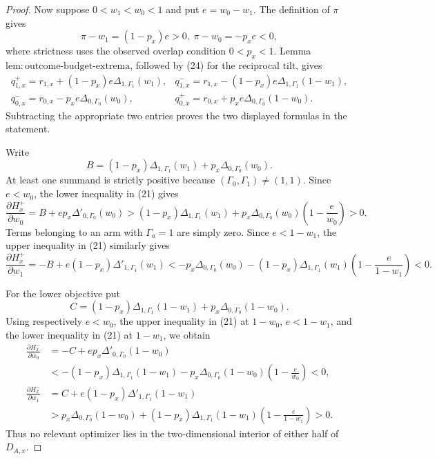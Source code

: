 \documentclass{article}
\begin{document}
\begin{proof}
Now suppose \(0<w_1<w_0<1\) and put \(e=w_0-w_1\).  The definition of \(\pi\) gives
\[
 \pi-w_1=(1-p_x)e>0,
 \; \pi-w_0=-p_xe<0,
 \tag{26}
\]
where strictness uses the observed overlap condition \(0<p_x<1\).  Lemma \(\mathrm{lem{:}outcome\text{-}budget\text{-}extrema}\), followed by (24) for the reciprocal tilt, gives
\[
\begin{array}{ll}
q^+_{1,x}=r_{1,x}+(1-p_x)e\Delta_{1,\Gamma_1}(w_1),
&q^-_{1,x}=r_{1,x}-(1-p_x)e\Delta_{1,\Gamma_1}(1-w_1),\\
q^-_{0,x}=r_{0,x}-p_xe\Delta_{0,\Gamma_0}(w_0),
&q^+_{0,x}=r_{0,x}+p_xe\Delta_{0,\Gamma_0}(1-w_0).
\end{array}
\tag{27}
\]
Subtracting the appropriate two entries proves the two displayed formulas in the statement.

Write
\[
 B=(1-p_x)\Delta_{1,\Gamma_1}(w_1)
   +p_x\Delta_{0,\Gamma_0}(w_0).
\]
At least one summand is strictly positive because \((\Gamma_0,\Gamma_1)\neq(1,1)\).  Since \(e<w_0\), the lower inequality in (21) gives
\[
 \frac{\partial H_x^+}{\partial w_0}
 =B+ep_x\Delta'_{0,\Gamma_0}(w_0)
 >(1-p_x)\Delta_{1,\Gamma_1}(w_1)
   +p_x\Delta_{0,\Gamma_0}(w_0)\left(1-\frac e{w_0}\right)>0.
 \tag{28}
\]
Terms belonging to an arm with \(\Gamma_a=1\) are simply zero.  Since \(e<1-w_1\), the upper inequality in (21) similarly gives
\[
 \frac{\partial H_x^+}{\partial w_1}
 =-B+e(1-p_x)\Delta'_{1,\Gamma_1}(w_1)
 <-p_x\Delta_{0,\Gamma_0}(w_0)
  -(1-p_x)\Delta_{1,\Gamma_1}(w_1)
       \left(1-\frac e{1-w_1}\right)<0.
 \tag{29}
\]

For the lower objective put
\[
 C=(1-p_x)\Delta_{1,\Gamma_1}(1-w_1)
   +p_x\Delta_{0,\Gamma_0}(1-w_0).
\]
Using respectively \(e<w_0\), the upper inequality in (21) at \(1-w_0\), \(e<1-w_1\), and the lower inequality in (21) at \(1-w_1\), we obtain
\[
\begin{aligned}
 \frac{\partial H_x^-}{\partial w_0}
 &=-C+ep_x\Delta'_{0,\Gamma_0}(1-w_0)\\
 &<-(1-p_x)\Delta_{1,\Gamma_1}(1-w_1)
   -p_x\Delta_{0,\Gamma_0}(1-w_0)\left(1-\frac e{w_0}\right)<0,\\
 \frac{\partial H_x^-}{\partial w_1}
 &=C+e(1-p_x)\Delta'_{1,\Gamma_1}(1-w_1)\\
 &>p_x\Delta_{0,\Gamma_0}(1-w_0)
   +(1-p_x)\Delta_{1,\Gamma_1}(1-w_1)
       \left(1-\frac e{1-w_1}\right)>0.
\end{aligned}
\tag{30}
\]
Thus no relevant optimizer lies in the two-dimensional interior of either half of \(D_{A,x}\).


\end{proof}
\end{document}
